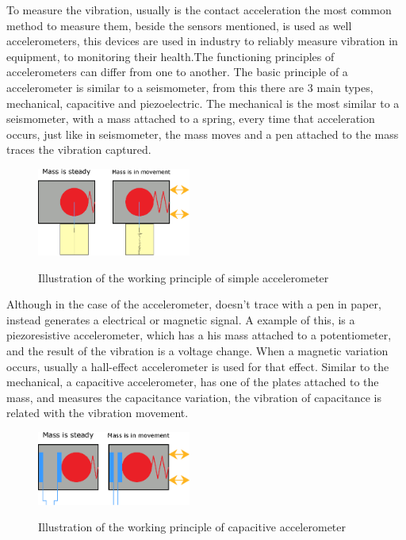 To measure the vibration, usually is the contact acceleration the most common method to measure them, beside the sensors mentioned, is used as well accelerometers, this devices are used in industry to reliably measure vibration in equipment, to monitoring their health.The functioning  principles of accelerometers can differ from one to another. The basic principle of a accelerometer is similar to a seismometer, from this there are 3 main types, mechanical, capacitive and piezoelectric. The mechanical is the most similar to a seismometer, with a mass attached to a spring, every time that acceleration occurs, just like in seismometer, the mass moves and a pen attached to the mass traces the vibration captured.
\begin{figure}[]
    \centering
    \includegraphics[width=0.45\textwidth]{Chapters/2CHP/Diagrams/seismometer.eps}
    \caption{Illustration of the working principle of simple accelerometer}{}    
    \label{fig:wseismometer}
\end{figure}
Although in the case of the accelerometer, doesn't trace with a pen in paper, instead generates a electrical or magnetic signal. A example of this, is a piezoresistive accelerometer, which has a his mass attached to a potentiometer, and the result of the vibration is a voltage change. When a magnetic variation occurs, usually a hall-effect accelerometer is used for that effect.  
Similar to the mechanical, a capacitive accelerometer, has one of the plates attached to the mass, and measures the capacitance variation, the vibration of capacitance is related with the vibration movement. 
\begin{figure}[]
    \centering
    \includegraphics[width=0.45\textwidth]{Chapters/2CHP/Diagrams/capacitiveacc.eps}
    \caption{Illustration of the working principle of capacitive accelerometer}{}    
    \label{fig:wcapacitiveacc}
\end{figure}
